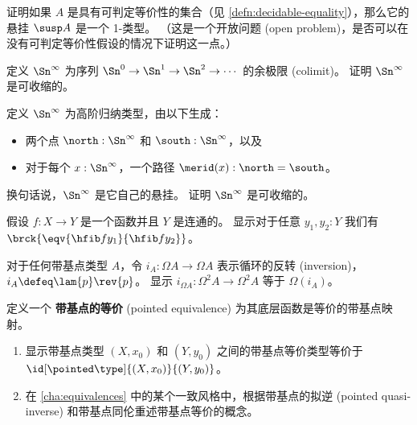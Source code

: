 {\begin{ex}\label{ex:decidable-equality-susp}
%
证明如果 $A$ 是具有可判定等价性的集合（见 \cref{defn:decidable-equality}），那么它的悬挂 $\susp A$ 是一个 1-类型。
（这是一个开放问题 (open problem)，是否可以在没有可判定等价性假设的情况下证明这一点。）
\end{ex}

\begin{ex}\label{ex:contr-infinity-sphere-colim}
定义 $\Sn^\infty$ 为序列 $\Sn^0 \to \Sn^1 \to \Sn^2 \to\cdots$ 的余极限 (colimit)。
证明 $\Sn^\infty$ 是可收缩的。
\end{ex}

\begin{ex}\label{ex:contr-infinity-sphere-susp}
定义 $\Sn^\infty$ 为高阶归纳类型，由以下生成：
\begin{itemize}
  \item 两个点 $\north:\Sn^\infty$ 和 $\south:\Sn^\infty$，以及
  \item 对于每个 $x:\Sn^\infty$，一个路径 $\merid(x):\north=\south$。
\end{itemize}
换句话说，$\Sn^\infty$ 是它自己的悬挂。
证明 $\Sn^\infty$ 是可收缩的。
\end{ex}

\begin{ex}\label{ex:unique-fiber}
假设 $f:X\to Y$ 是一个函数并且 $Y$ 是连通的。
显示对于任意 $y_1,y_2:Y$ 我们有 $\brck{\eqv{\hfib f {y_1}}{\hfib f {y_2}}}$。
\end{ex}

\begin{ex}\label{ex:ap-path-inversion}
对于任何带基点类型 $A$，令 $i_A : \Omega A \to \Omega A$ 表示循环的反转 (inversion)，$i_A \defeq \lam{p} \rev{p}$。
显示 $i_{\Omega A} : \Omega^2 A \to \Omega^2 A$ 等于 $\Omega(i_A)$。
\end{ex}

\begin{ex}\label{ex:pointed-equivalences}
定义一个 \textbf{带基点的等价} (pointed equivalence) 为其底层函数是等价的带基点映射。
\begin{enumerate}
  \item 显示带基点类型 $(X,x_0)$ 和 $(Y,y_0)$ 之间的带基点等价类型等价于 $\id[\pointed\type]{(X,x_0)}{(Y,y_0)}$。
  \item 在 \cref{cha:equivalences} 中的某个一致风格中，根据带基点的拟逆 (pointed quasi-inverse) 和带基点同伦重述带基点等价的概念。
\end{enumerate}
\end{ex}

}

